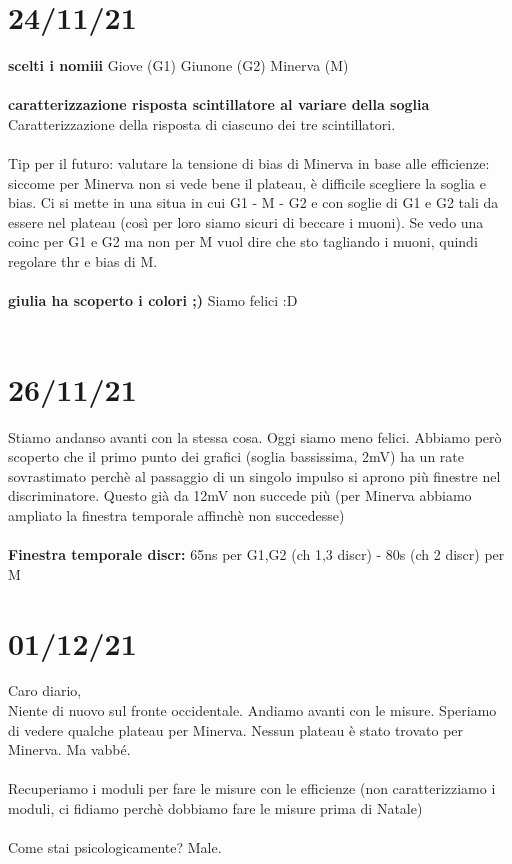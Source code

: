 \documentclass{article}
\begin{document}
\section{24/11/21}
\textbf{scelti i nomiii}
Giove (G1)
Giunone (G2)
Minerva (M)\\\\
\textbf{caratterizzazione risposta scintillatore al variare della soglia}\\
Caratterizzazione della risposta di ciascuno dei tre scintillatori.\\\\
Tip per il futuro: valutare la tensione di bias di Minerva in base alle efficienze: siccome per Minerva non si vede bene il plateau, è difficile scegliere la soglia e bias. Ci si mette in una situa in cui G1 - M - G2 e con soglie di G1 e G2 tali da essere nel plateau (così per loro siamo sicuri di beccare i muoni). Se vedo una coinc per G1 e G2 ma non per M vuol dire che sto tagliando i muoni, quindi regolare thr e bias di M.\\\\
\textbf{giulia ha scoperto i colori ;)}
Siamo felici :D \\\\


\section{26/11/21}
Stiamo andanso avanti con la stessa cosa. Oggi siamo meno felici. Abbiamo però scoperto che il primo punto dei grafici (soglia bassissima, 2mV) ha un rate sovrastimato perchè al passaggio di un singolo impulso si aprono più finestre nel discriminatore. Questo già da 12mV non succede più (per Minerva abbiamo ampliato la finestra temporale affinchè non succedesse)\\\\
\textbf{Finestra temporale discr:} 65ns per G1,G2 (ch 1,3 discr) - 80s (ch 2 discr) per M

\section{01/12/21}
Caro diario,\\
Niente di nuovo sul fronte occidentale. Andiamo avanti con le misure. Speriamo di vedere qualche plateau per Minerva. Nessun plateau è stato trovato per Minerva. Ma vabbé.\\\\
Recuperiamo i moduli per fare le misure con le efficienze (non caratterizziamo i moduli, ci fidiamo perchè dobbiamo fare le misure prima di Natale)\\\\
Come stai psicologicamente? Male.
\end{document}
